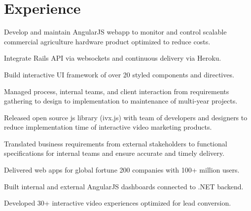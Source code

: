 \documentclass[]{deedy-resume-openfont}
\begin{document}
\begin{minipage}[t]{0.66\textwidth}


\section{Experience}

\vspace{\topsep} %
\begin{tightemize}
\item Develop and maintain AngularJS webapp to monitor and control scalable commercial agriculture hardware product optimized to reduce costs. \item Integrate Rails API via websockets and continuous delivery via Heroku. \item Build interactive UI framework of over 20 styled components and directives. \end{tightemize}
\sectionsep

\begin{tightemize}
\item Managed process, internal teams, and client interaction from requirements gathering to design to implementation to maintenance of multi-year projects. \item Released open source js library (ivx.js) with team of developers and designers to reduce implementation time of interactive video marketing products. \item Translated business requirements from external stakeholders to functional specifications for internal teams and ensure accurate and timely delivery.\end{tightemize}
\sectionsep

\begin{tightemize}
\item Delivered web apps for global fortune 200 companies with 100+ million users.\item Built internal and external AngularJS dashboards connected to  .NET backend.\item Developed 30+ interactive video experiences optimized for lead conversion.\end{tightemize}
\sectionsep


\end{minipage}
\end{document}
